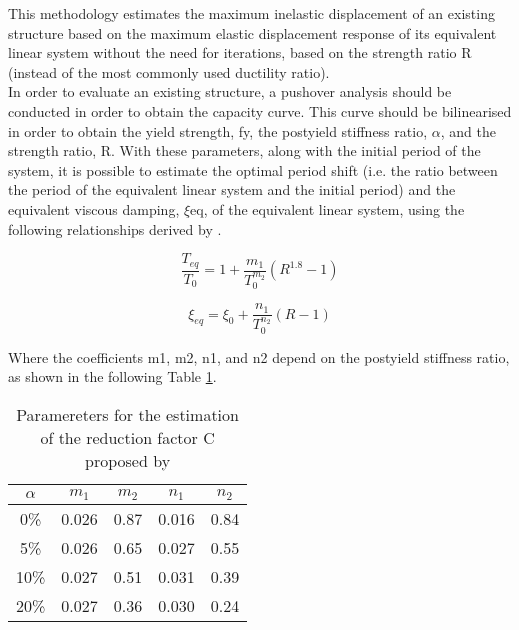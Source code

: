 This methodology estimates the maximum inelastic displacement of an existing structure based on the maximum elastic displacement response of its equivalent linear system without the need for iterations, based on the strength ratio R (instead of the most commonly used ductility ratio).\\

In order to evaluate an existing structure, a pushover analysis should be conducted in order to obtain the capacity curve. This curve should be bilinearised in order to obtain the yield strength, fy, the postyield stiffness ratio, $\alpha$, and the strength ratio, R. With these parameters, along with the initial period of the system, it is possible to estimate the optimal period shift (i.e. the ratio between the period of the equivalent linear system and the initial period) and the equivalent viscous damping, $\xi$eq, of the equivalent linear system, using the following relationships derived by \citep{LinMiranda2008}.
	 
\begin{equation}
\frac{T_{eq}}{T_{0}} = 1 + \frac{m_1}{T_0^{m_2}}\left(R^{1.8}-1\right)
\end{equation} 

\begin{equation}
\xi_{eq} = \xi_{0} + \frac{n_1}{T_0^{n_2}}\left(R-1\right)
\end{equation}   

Where the coefficients m1, m2, n1, and n2 depend on the postyield stiffness ratio, as shown in the following Table \ref{table:LinMiranda2008}.

\begin {table}[htb]
\caption{Paramereters for the estimation of the reduction factor C proposed by \citep{LinMiranda2008}} 
\label{table:LinMiranda2008} 
\begin{center}
  \begin{tabular}{ | c | c | c | c | c |}
    \hline
    $\alpha$ & $m_1$ & $m_2$ & $n_1$ & $n_2$ \\ \hline
    0\% & 0.026 & 0.87 & 0.016 & 0.84 \\ \hline
    5\% & 0.026 & 0.65 & 0.027 & 0.55 \\ \hline
    10\% & 0.027 & 0.51 & 0.031 & 0.39 \\ \hline
    20\% & 0.027 & 0.36 & 0.030 & 0.24 \\ \hline
  \end{tabular}
\end{center}
\end{table}

